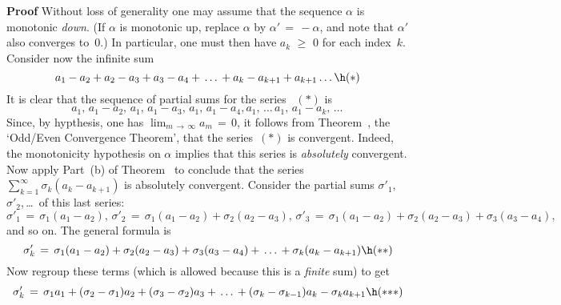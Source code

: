 \V

        {\bf Proof} Without loss of generality one may assume that the sequence ${\alpha}$ is monotonic {\em down}.
    (If ${\alpha}$ is monotonic up, replace ${\alpha}$ by ${\alpha}' \,=\, -{\alpha}$, and note that ${\alpha}'$ also converges to~$0$.)
    In particular, one must then have $a_{k}\,\,{\geq}\,\,0$ for each index~$k$.
    Consider now the infinite sum
        \begin{displaymath}
        a_{1} - a_{2} + a_{2} - a_{3} + a_{3} - a_{4} + \,{\ldots}\, + a_{k} - a_{k+1} + a_{k+1} \,{\ldots}\, \h ({\ast})
        \end{displaymath}
    It is clear that the sequence of partial sums for the series~
$({\ast})$ is
        \begin{displaymath}
        a_{1}, \, a_{1}-a_{2}, \, a_{1}, \, a_{1} - a_{3}, \, a_{1}, \, a_{1} - a_{4}, a_{1},\,{\ldots}\,a_{1}, \, a_{1} - a_{k},\,{\ldots}\,
        \end{displaymath}
    Since, by hypthesis, one has $\lim_{m \,{\rightarrow}\, {\infty}} a_{m} \,=\, 0$,
    it follows from Theorem~, the `Odd/Even Convergence Theorem', that the series~$({\ast})$ is convergent.
    Indeed, the monotonicity hypothesis on ${\alpha}$ implies that this series is {\em absolutely} convergent.
    Now apply Part~(b) of Theorem~ to conclude that the series $\sum_{k=1}^{{\infty}} {\sigma}_{k}(a_{k} - a_{k+1})$ is absolutely convergent.
    Consider the partial sums ${\sigma}'_{1}$, ${\sigma}'_{2}$,\,{\ldots}\, of this last series:
        \begin{displaymath}
        {\sigma}'_{1} \,=\, {\sigma}_{1}(a_{1} - a_{2}), \, {\sigma}'_{2} \,=\, {\sigma}_{1}(a_{1} - a_{2}) + {\sigma}_{2}(a_{2} - a_{3}), \,
    {\sigma}'_{3} \,=\, {\sigma}_{1}(a_{1} - a_{2}) + {\sigma}_{2}(a_{2} - a_{3}) + {\sigma}_{3}(a_{3} -a_{4}),
        \end{displaymath}
    and so on. The general formula is
        \begin{displaymath}
        {\sigma}'_{k} \,=\, {\sigma}_{1}(a_{1} - a_{2}) + {\sigma}_{2}(a_{2} - a_{3}) + {\sigma}_{3}(a_{3} -a_{4}) + \,{\ldots}\, + {\sigma}_{k}(a_{k}-a_{k+1}) \h ({\ast}{\ast})
        \end{displaymath}
    Now regroup these terms (which is allowed because this is a {\em finite} sum) to get
        \begin{displaymath}
        {\sigma}'_{k} \,=\, {\sigma}_{1}a_{1} + ({\sigma}_{2} - {\sigma}_{1})a_{2} + ({\sigma}_{3}-{\sigma}_{2})a_{3} + \,{\ldots}\, + ({\sigma}_{k} - {\sigma}_{k-1})a_{k} - {\sigma}_{k}a_{k+1} \h ({\ast}{\ast}{\ast})
        \end{displaymath}
